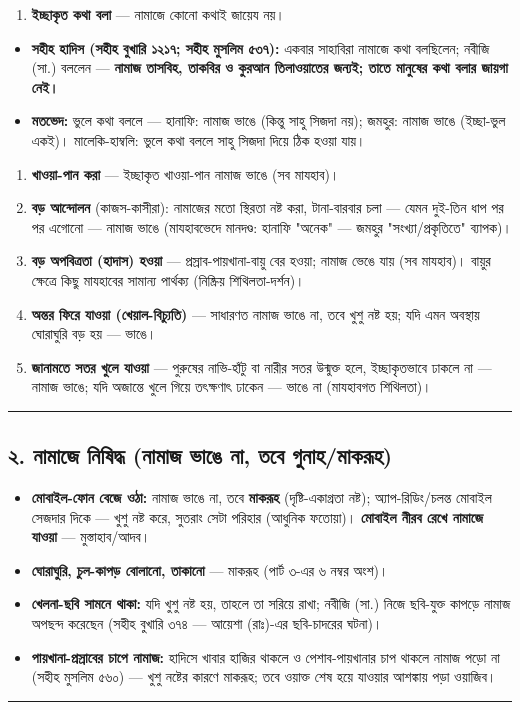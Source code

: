 \begin{enumerate}
\item \textbf{ইচ্ছাকৃত কথা বলা} — নামাজে কোনো কথাই জায়েয নয়।
\end{enumerate}
\begin{itemize}
\item \textbf{সহীহ হাদিস (সহীহ বুখারি ১২১৭; সহীহ মুসলিম ৫৩৭):} একবার সাহাবিরা নামাজে কথা বলছিলেন; নবীজি (সা.) বললেন — \textbf{নামাজ তাসবিহ, তাকবির ও কুরআন তিলাওয়াতের জন্যই; তাতে মানুষের কথা বলার জায়গা নেই।}
\item \textbf{মতভেদ:} ভুলে কথা বললে — হানাফি: নামাজ ভাঙে (কিন্তু সাহু সিজদা নয়); জমহুর: নামাজ ভাঙে (ইচ্ছা-ভুল একই)। মালেকি-হাম্বলি: ভুলে কথা বললে সাহু সিজদা দিয়ে ঠিক হওয়া যায়।
\end{itemize}
\begin{enumerate}
\item \textbf{খাওয়া-পান করা} — ইচ্ছাকৃত খাওয়া-পান নামাজ ভাঙে (সব মাযহাব)।
\item \textbf{বড় আন্দোলন} (কাজস-কাসীরা): নামাজের মতো স্থিরতা নষ্ট করা, টানা-বারবার চলা — যেমন দুই-তিন ধাপ পর পর এগোনো — নামাজ ভাঙে (মাযহাবভেদে মানদণ্ড: হানাফি "অনেক" — জমহুর "সংখ্যা/প্রকৃতিতে" ব্যাপক)।
\item \textbf{বড় অপবিত্রতা (হাদাস) হওয়া} — প্রস্রাব-পায়খানা-বায়ু বের হওয়া; নামাজ ভেঙে যায় (সব মাযহাব)। বায়ুর ক্ষেত্রে কিছু মাযহাবের সামান্য পার্থক্য (নিষ্ক্রিয় শিথিলতা-দর্শন)।
\item \textbf{অন্তর ফিরে যাওয়া (খেয়াল-বিচ্যুতি)} — সাধারণত নামাজ ভাঙে না, তবে খুশু নষ্ট হয়; যদি এমন অবস্থায় ঘোরাঘুরি বড় হয় — ভাঙে।
\item \textbf{জানামতে সতর খুলে যাওয়া} — পুরুষের নাভি-হাঁটু বা নারীর সতর উন্মুক্ত হলে, ইচ্ছাকৃতভাবে ঢাকলে না — নামাজ ভাঙে; যদি অজান্তে খুলে গিয়ে তৎক্ষণাৎ ঢাকেন — ভাঙে না (মাযহাবগত শিথিলতা)।
\end{enumerate}
\medskip\hrule\medskip

\subsection*{২. নামাজে নিষিদ্ধ (নামাজ ভাঙে না, তবে গুনাহ/মাকরূহ)}

\begin{itemize}
\item \textbf{মোবাইল-ফোন বেজে ওঠা:} নামাজ ভাঙে না, তবে \textbf{মাকরূহ} (দৃষ্টি-একাগ্রতা নষ্ট); অ্যাপ-রিডিং/চলন্ত মোবাইল সেজদার দিকে — খুশু নষ্ট করে, সুতরাং সেটা পরিহার (আধুনিক ফতোয়া)। \textbf{মোবাইল নীরব রেখে নামাজে যাওয়া} — মুস্তাহাব/আদব।
\item \textbf{ঘোরাঘুরি, চুল-কাপড় বোলানো, তাকানো} — মাকরূহ (পার্ট ৩-এর ৬ নম্বর অংশ)।
\item \textbf{খেলনা-ছবি সামনে থাকা:} যদি খুশু নষ্ট হয়, তাহলে তা সরিয়ে রাখা; নবীজি (সা.) নিজে ছবি-যুক্ত কাপড়ে নামাজ অপছন্দ করেছেন (সহীহ বুখারি ৩৭৪ — আয়েশা (রাঃ)-এর ছবি-চাদরের ঘটনা)।
\item \textbf{পায়খানা-প্রস্রাবের চাপে নামাজ:} হাদিসে খাবার হাজির থাকলে ও পেশাব-পায়খানার চাপ থাকলে নামাজ পড়ো না (সহীহ মুসলিম ৫৬০) — খুশু নষ্টের কারণে মাকরূহ; তবে ওয়াক্ত শেষ হয়ে যাওয়ার আশঙ্কায় পড়া ওয়াজিব।
\end{itemize}
\medskip\hrule\medskip


